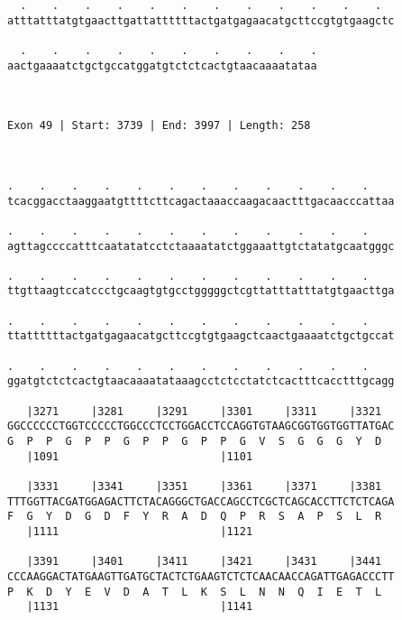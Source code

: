 \documentclass{article}
\begin{document}
\begin{Verbatim}
  .    .    .    .    .    .    .    .    .    .    .    .  
atttatttatgtgaacttgattattttttactgatgagaacatgcttccgtgtgaagctc
                                                            
  .    .    .    .    .    .    .    .    .    .
aactgaaaatctgctgccatggatgtctctcactgtaacaaaatataa
                                                
                                                
 
Exon 49 | Start: 3739 | End: 3997 | Length: 258



.    .    .    .    .    .    .    .    .    .    .    .    
tcacggacctaaggaatgttttcttcagactaaaccaagacaactttgacaacccattaa
                                                            
.    .    .    .    .    .    .    .    .    .    .    .    
agttagccccatttcaatatatcctctaaaatatctggaaattgtctatatgcaatgggc
                                                            
.    .    .    .    .    .    .    .    .    .    .    .    
ttgttaagtccatccctgcaagtgtgcctgggggctcgttatttatttatgtgaacttga
                                                            
.    .    .    .    .    .    .    .    .    .    .    .    
ttattttttactgatgagaacatgcttccgtgtgaagctcaactgaaaatctgctgccat
                                                            
.    .    .    .    .    .    .    .    .    .    .    .    
ggatgtctctcactgtaacaaaatataaagcctctcctatctcactttcacctttgcagg
                                                            
   |3271     |3281     |3291     |3301     |3311     |3321  
GGCCCCCCTGGTCCCCCTGGCCCTCCTGGACCTCCAGGTGTAAGCGGTGGTGGTTATGAC
G  P  P  G  P  P  G  P  P  G  P  P  G  V  S  G  G  G  Y  D  
   |1091                         |1101                      
  
   |3331     |3341     |3351     |3361     |3371     |3381  
TTTGGTTACGATGGAGACTTCTACAGGGCTGACCAGCCTCGCTCAGCACCTTCTCTCAGA
F  G  Y  D  G  D  F  Y  R  A  D  Q  P  R  S  A  P  S  L  R  
   |1111                         |1121                      
  
   |3391     |3401     |3411     |3421     |3431     |3441  
CCCAAGGACTATGAAGTTGATGCTACTCTGAAGTCTCTCAACAACCAGATTGAGACCCTT
P  K  D  Y  E  V  D  A  T  L  K  S  L  N  N  Q  I  E  T  L  
   |1131                         |1141                      
  

\end{Verbatim}
\end{document}
